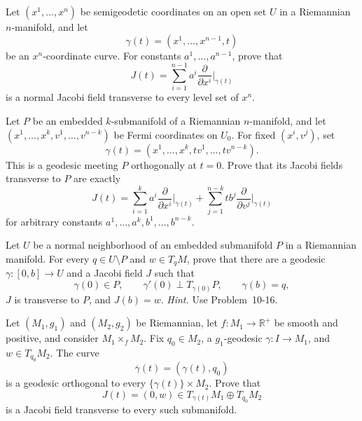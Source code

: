 \begin{exercise}
\label{prob:jacobi-semigeodetic-transverse}

Let $(x^1,\ldots,x^n)$ be semigeodetic coordinates on an open set $U$ in a
Riemannian $n$-manifold, and let
\[
\gamma(t)=(x^1,\ldots,x^{n-1},t)
\]
be an $x^n$-coordinate curve. For constants
$a^1,\ldots,a^{n-1}$, prove that
\[
J(t)=\sum_{i=1}^{n-1}
a^i\frac{\partial}{\partial x^i}\bigg|_{\gamma(t)}
\]
is a normal Jacobi field transverse to every level set of $x^n$.
\end{exercise}

\begin{exercise}
\label{prob:jacobi-fermi-transverse}

Let $P$ be an embedded $k$-submanifold of a Riemannian $n$-manifold, and let
$(x^1,\ldots,x^k,v^1,\ldots,v^{n-k})$ be Fermi coordinates on $U_0$. For
fixed $(x^i,v^j)$, set
\[
\gamma(t)=(x^1,\ldots,x^k,tv^1,\ldots,tv^{n-k}).
\]
This is a geodesic meeting $P$ orthogonally at $t=0$. Prove that its Jacobi
fields transverse to $P$ are exactly
\[
J(t)
=\sum_{i=1}^ka^i\frac{\partial}{\partial x^i}\bigg|_{\gamma(t)}
+\sum_{j=1}^{n-k}tb^j
\frac{\partial}{\partial v^j}\bigg|_{\gamma(t)}
\]
for arbitrary constants $a^1,\ldots,a^k,b^1,\ldots,b^{n-k}$.
\end{exercise}

\begin{exercise}
\label{prob:tangent-vector-jacobi-normal-neighborhood}

Let $U$ be a normal neighborhood of an embedded submanifold $P$ in a
Riemannian manifold. For every $q\in U\setminus P$ and $w\in T_qM$, prove
that there are a geodesic $\gamma:[0,b]\to U$ and a Jacobi field $J$ such
that
\[
\gamma(0)\in P,\qquad
\gamma'(0)\perp T_{\gamma(0)}P,\qquad
\gamma(b)=q,
\]
$J$ is transverse to $P$, and $J(b)=w$.
\emph{Hint.} Use Problem~10-16.
\end{exercise}

\begin{exercise}
\label{prob:jacobi-warped-product}

Let $(M_1,g_1)$ and $(M_2,g_2)$ be Riemannian, let
$f:M_1\to\mathbb R^+$ be smooth and positive, and consider
$M_1\times_fM_2$. Fix $q_0\in M_2$, a $g_1$-geodesic
$\gamma:I\to M_1$, and $w\in T_{q_0}M_2$. The curve
\[
\overline\gamma(t)=(\gamma(t),q_0)
\]
is a geodesic orthogonal to every $\{\gamma(t)\}\times M_2$. Prove that
\[
J(t)=(0,w)\in T_{\gamma(t)}M_1\oplus T_{q_0}M_2
\]
is a Jacobi field transverse to every such submanifold.
\end{exercise}

